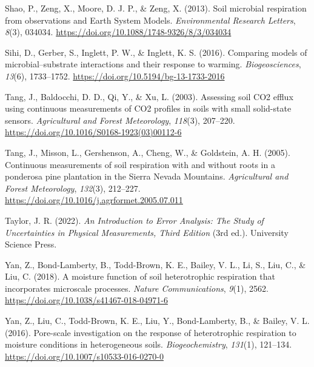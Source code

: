 \documentclass[
  letterpaper,
  DIV=11,
  numbers=noendperiod]{scrartcl}
\newlength{\cslhangindent}
\newenvironment{CSLReferences}[2] %
 {\begin{list}{}{%
  \setlength{\itemindent}{0pt}
  \setlength{\leftmargin}{0pt}
  \setlength{\parsep}{0pt}
  \ifodd #1
   \setlength{\leftmargin}{\cslhangindent}
   \setlength{\itemindent}{-1\cslhangindent}
  \fi
  \setlength{\itemsep}{#2\baselineskip}}}
 {\end{list}}
\begin{document}
\begin{CSLReferences}{1}{0}
Shao, P., Zeng, X., Moore, D. J. P., \& Zeng, X. (2013). Soil microbial
respiration from observations and {Earth System Models}.
\emph{Environmental Research Letters}, \emph{8}(3), 034034.
\url{https://doi.org/10.1088/1748-9326/8/3/034034}

Sihi, D., Gerber, S., Inglett, P. W., \& Inglett, K. S. (2016).
Comparing models of microbial--substrate interactions and their response
to warming. \emph{Biogeosciences}, \emph{13}(6), 1733--1752.
\url{https://doi.org/10.5194/bg-13-1733-2016}

Tang, J., Baldocchi, D. D., Qi, Y., \& Xu, L. (2003). Assessing soil
{CO2} efflux using continuous measurements of {CO2} profiles in soils
with small solid-state sensors. \emph{Agricultural and Forest
Meteorology}, \emph{118}(3), 207--220.
\url{https://doi.org/10.1016/S0168-1923(03)00112-6}

Tang, J., Misson, L., Gershenson, A., Cheng, W., \& Goldstein, A. H.
(2005). Continuous measurements of soil respiration with and without
roots in a ponderosa pine plantation in the {Sierra Nevada Mountains}.
\emph{Agricultural and Forest Meteorology}, \emph{132}(3), 212--227.
\url{https://doi.org/10.1016/j.agrformet.2005.07.011}

Taylor, J. R. (2022). \emph{An {Introduction} to {Error Analysis}: {The
Study} of {Uncertainties} in {Physical Measurements}, {Third Edition}}
(3rd ed.). University Science Press.

Yan, Z., Bond-Lamberty, B., Todd-Brown, K. E., Bailey, V. L., Li, S.,
Liu, C., \& Liu, C. (2018). A moisture function of soil heterotrophic
respiration that incorporates microscale processes. \emph{Nature
Communications}, \emph{9}(1), 2562.
\url{https://doi.org/10.1038/s41467-018-04971-6}

Yan, Z., Liu, C., Todd-Brown, K. E., Liu, Y., Bond-Lamberty, B., \&
Bailey, V. L. (2016). Pore-scale investigation on the response of
heterotrophic respiration to moisture conditions in heterogeneous soils.
\emph{Biogeochemistry}, \emph{131}(1), 121--134.
\url{https://doi.org/10.1007/s10533-016-0270-0}


\end{CSLReferences}
\end{document}
